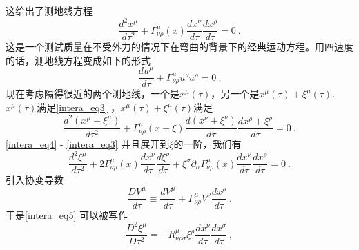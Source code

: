 这给出了测地线方程
\begin{equation}\label{intera_eq3}
\frac{d^2 x^\mu}{d \tau^2} + \Gamma^\mu_{\nu\rho} (x) \frac{dx^\nu}{d \tau} \frac{dx^\rho}{d\tau} = 0~. 
\end{equation}
这是一个测试质量在不受外力的情况下在弯曲的背景下的经典运动方程。用四速度的话，测地线方程变成如下的形式
\begin{equation}
\frac{du^\mu}{d\tau} + \Gamma^\mu_{\nu\rho} u^\nu u^\rho = 0~.
\end{equation}
现在考虑隔得很近的两个测地线，一个是$x^\mu(\tau)$，另一个是$x^\mu(\tau)+\xi^\mu(\tau)$. $x^\mu(\tau)$满足\autoref{intera_eq3} ，$x^\mu(\tau) + \xi^\mu(\tau)$满足
\begin{equation}\label{intera_eq4}
\frac{d^2(x^\mu+\xi^\mu)}{d\tau^2} + \Gamma^\mu_{\nu\rho} (x+\xi) \frac{d(x^\nu+\xi^\nu)}{d\tau} \frac{d x^\rho+\xi^\rho}{d \tau} = 0~.
\end{equation}
\autoref{intera_eq4} - \autoref{intera_eq3} 并且展开到$\xi$的一阶，我们有
\begin{equation}\label{intera_eq5}
\frac{d^2 \xi^\mu}{d \tau^2} + 2 \Gamma^\mu_{\nu\rho} (x) \frac{dx^\nu}{d\tau} \frac{d\xi^\rho}{d\tau} + \xi^\sigma \partial_\sigma \Gamma^\mu_{\nu\rho} (x) \frac{dx^\nu}{d\tau} \frac{dx^\rho}{d\tau} = 0 ~. 
\end{equation}
引入协变导数
\begin{equation}
\frac{D V^\mu}{d\tau} \equiv \frac{d V^\mu}{d\tau} + \Gamma^\mu_{\nu\rho} V^\nu \frac{dx^\rho}{d\tau} ~.
\end{equation}
于是\autoref{intera_eq5} 可以被写作
\begin{equation}
\frac{D^2 \xi^\mu}{D \tau^2} = - R^\mu_{\nu\rho\sigma} \xi^\rho \frac{dx^\nu}{d\tau} \frac{dx^\sigma}{d\tau} ~,
\end{equation}





